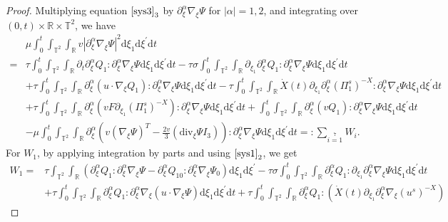 \documentclass[10pt,reqno]{amsart}
\numberwithin{equation}{section}
\newcommand{\dif}{\mathrm{d}}
\newcommand{\ddiv}{\mathrm{div}}
\begin{document}
\begin{proof}
 Multiplying equation $\eqref{sys3}_3$ by $\partial_\xi^\alpha\nabla_\xi\Psi$ for $|\alpha|=1,2$, and integrating over $(0, t)\times\mathbb{R}\times\mathbb{T}^2$, we have
\begin{align*}
&\mu\int_0^t\int_{\mathbb{T}^2}\int_{\mathbb{R}}v|\partial_\xi^\alpha\nabla_\xi\Psi|^2\dif \xi_1\dif \xi^{\prime}\dif t
\\
=&\tau\int_0^t\int_{\mathbb{T}^2}\int_{\mathbb{R}}
\partial_t\partial_\xi^\alpha Q_1
:\partial_\xi^\alpha\nabla_\xi\Psi\dif \xi_1\dif \xi^{\prime}\dif t
-\tau\sigma\int_0^t\int_{\mathbb{T}^2}\int_{\mathbb{R}}
\partial_{\xi_1}\partial_\xi^\alpha Q_1
:\partial_\xi^\alpha\nabla_\xi\Psi\dif \xi_1\dif \xi^{\prime}\dif t\\
&+\tau\int_0^t\int_{\mathbb{T}^2}\int_{\mathbb{R}}
        \partial_\xi^\alpha ( u\cdot\nabla_\xi Q_1)
:\partial_\xi^\alpha\nabla_\xi\Psi\dif \xi_1\dif \xi^{\prime}\dif t
-\tau\int_0^t\int_{\mathbb{T}^2}\int_{\mathbb{R}}
     \dot{X}(t)\partial_{\xi_1}\partial_\xi^\alpha(\Pi_1^s)^{-X}
:\partial_\xi^\alpha\nabla_\xi\Psi\dif \xi_1\dif \xi^{\prime}\dif t\\
&+\tau\int_0^t\int_{\mathbb{T}^2}\int_{\mathbb{R}}
        \partial_\xi^\alpha(vF\partial_{\xi_1}(\Pi_1^s)^{-X})
:\partial_\xi^\alpha\nabla_\xi\Psi\dif \xi_1\dif \xi^{\prime}\dif t
+\int_0^t\int_{\mathbb{T}^2}\int_{\mathbb{R}}
    \partial_\xi^\alpha(v  Q_1)
:\partial_\xi^\alpha\nabla_\xi\Psi\dif \xi_1\dif \xi^{\prime}\dif t\\
&-\mu\int_0^t\int_{\mathbb{T}^2}\int_{\mathbb{R}}
\partial_\xi^\alpha\left(v\left(\nabla_\xi\Psi\right)^T
-\frac{2v}{3}\left(\ddiv_\xi\Psi I_3\right)\right):\partial_\xi^\alpha\nabla_\xi\Psi
\dif \xi_1\dif \xi^{\prime}\dif t=:\sum\limits_{i=1}\limits^7W_i.
\end{align*}
For $W_1$, by applying integration by parts and using $\eqref{sys1}_2$, we get
\begin{align*}
W_1
=&\tau\int_{\mathbb{T}^2}\int_{\mathbb{R}}
\left(\partial_\xi^\alpha Q_1
:\partial_\xi^\alpha\nabla_\xi\Psi
-\partial_\xi^\alpha Q_{10}
:\partial_\xi^\alpha\nabla_\xi\Psi_0\right)\dif \xi_1\dif \xi^{\prime}
-\tau\sigma\int_0^t\int_{\mathbb{T}^2}\int_{\mathbb{R}}
\partial_\xi^\alpha Q_1: \partial_{\xi_1}\partial_\xi^\alpha\nabla_\xi\Psi
\dif \xi_1\dif \xi^{\prime}\dif t\\
&+\tau\int_0^t\int_{\mathbb{T}^2}\int_{\mathbb{R}}
\partial_\xi^\alpha Q_1: \partial_\xi^\alpha\nabla_\xi(u\cdot\nabla_\xi\Psi)
        \dif \xi_1\dif \xi^{\prime}\dif t
+\tau\int_0^t\int_{\mathbb{T}^2}\int_{\mathbb{R}}
\partial_\xi^\alpha Q_1: (\dot{X}(t)\partial_{\xi_1}\partial_\xi^\alpha\nabla_\xi(u^s)^{-X})

\end{align*}
\end{proof}
\end{document}
